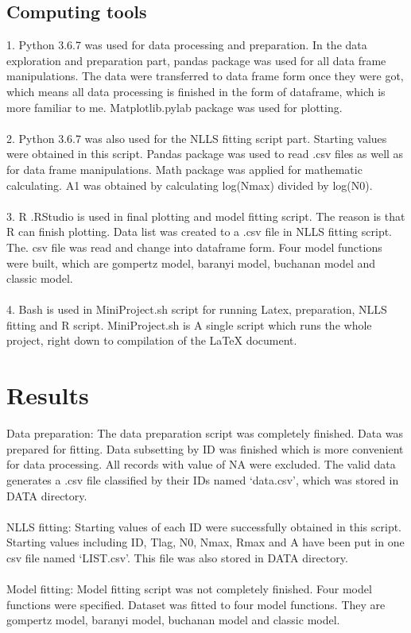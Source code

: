 \documentclass[11pt]{article}
\begin{document}
    \subsection{Computing tools}
    1.	Python 3.6.7 was used for data processing and preparation. In the data exploration and preparation part, pandas package was used for all data frame manipulations. The data were transferred to data frame form once they were got, which means all data processing is finished in the form of dataframe, which is more familiar to me. Matplotlib.pylab package was used for plotting. 
    \\\\2.	Python 3.6.7 was also used for the NLLS fitting script part. Starting values were obtained in this script. Pandas package was used to read .csv files as well as for data frame manipulations. Math package was applied for mathematic calculating. A1 was obtained by calculating log(Nmax) divided by log(N0). 
    \\\\3.	R .RStudio is used in final plotting and model fitting script. The reason is that R can finish plotting. Data list was created to a .csv file in NLLS fitting script. The. csv file was read and change into dataframe form. Four model functions were built, which are gompertz model, baranyi model, buchanan model and classic model.
    \\\\4.	Bash is used in MiniProject.sh script for running Latex, preparation, NLLS fitting and R script. MiniProject.sh is A single script which runs the whole project, right down to compilation of the LaTeX document. 
  
  \section{Results}
  Data preparation:  The data preparation script was completely finished.  Data was prepared for fitting. Data subsetting by ID was finished which is more convenient for data processing. All records with value of NA were excluded. The valid data generates a .csv file classified by their IDs named ‘data.csv’, which was stored in DATA directory.
  \\\\NLLS fitting:  Starting values of each ID were successfully obtained in this script. Starting values including ID, Tlag, N0, Nmax, Rmax and A have been put in one csv file named ‘LIST.csv’. This file was also stored in DATA directory.
  \\\\Model fitting:  Model fitting script was not completely finished.  Four model functions were specified. Dataset was fitted to four model functions. They are gompertz model, baranyi model, buchanan model and classic model.
\end{document}
